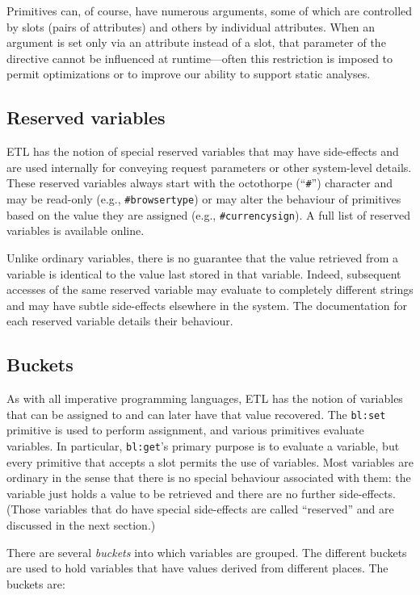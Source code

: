 \documentclass{www2003-submission}
\newcommand{\smtexttt}[1]{{\small\texttt{#1}}}
\begin{document}
Primitives can, of course, have numerous arguments, some of which are
controlled by slots (pairs of attributes) and others by individual
attributes.  When an argument is set only via an attribute instead of a
slot, that parameter of the directive cannot be influenced at
runtime---often this restriction is imposed to permit optimizations or
to improve our ability to support static analyses.

\subsection{Reserved variables}

ETL has the notion of special reserved variables that may have
side-effects and are used internally for conveying request parameters or
other system-level details.  These reserved variables always start with
the octothorpe (``\smtexttt{\#}'') character and may be read-only (e.g.,
\smtexttt{\#browsertype}) or may alter the behaviour of primitives based
on the value they are assigned (e.g., \smtexttt{\#currencysign}).  A
full list of reserved variables is available
online.~\cite{etl-reserved-variables}

Unlike ordinary variables, there is no guarantee that the value
retrieved from a variable is identical to the value last stored in that
variable.  Indeed, subsequent accesses of the same reserved
variable may evaluate to completely different strings and may have
subtle side-effects elsewhere in the system.  The documentation for each
reserved variable details their behaviour.

\subsection{Buckets}
As with all imperative programming languages, ETL has the notion of
variables that can be assigned to and can later have that value
recovered.  The \smtexttt{bl:set} primitive is used to perform
assignment, and various primitives evaluate variables. In particular,
\smtexttt{bl:get}'s primary purpose is to evaluate a variable, but
every primitive that accepts a slot permits the use of variables.  Most
variables are ordinary in the sense that there is no special behaviour
associated with them: the variable just holds a value to be retrieved and
there are no further side-effects.  (Those variables that do have special
side-effects are called ``reserved'' and are discussed in the next
section.)

There are several \emph{buckets} into which variables are grouped.  The
different buckets are used to hold variables that have values derived
from different places.  The buckets are:
\end{document}
